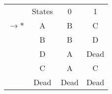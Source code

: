 \begin{tabular}[c]{r|c|c|c|} \cline{2-4}
    & States & 0 & 1 \\ \cline{2-4}
    $\rightarrow *$ & A & B & C \\ \cline{2-4}
    & B & B & D \\ \cline{2-4}
    & D & A & Dead \\ \cline{2-4}
    & C & A & C \\ \cline{2-4}
    & Dead & Dead & Dead \\ \cline{2-4}

\end{tabular}
